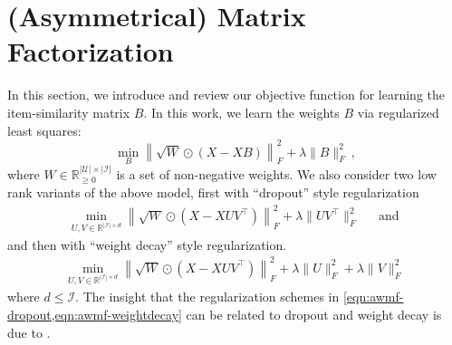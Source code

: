 \section{(Asymmetrical) Matrix Factorization}
In this section, we introduce and review our objective function for learning the item-similarity matrix $B$. In this work, we learn the weights $B$ via regularized least squares:
\begin{equation}\label{eqn:ease}
    \min_{B} \left\lVert \sqrt{W} \odot (X - XB)\right\rVert_F^2 + \lambda \|B\|_F^2\,,
\end{equation}
where $W \in \mathbb{R}_{\geq 0}^{|\mathcal{U}|\times |\mathcal{I}|}$ is a set of non-negative weights. We also consider two low rank variants of the above model, first with ``dropout'' style regularization
\begin{align}\label{eqn:awmf-dropout}
    \min_{U,V\in\mathbb{R}^{|\mathcal{I}|\times d}} \left\lVert \sqrt{W} \odot (X - XUV^\top)\right\rVert_F^2 + \lambda\|UV^\top\|_F^2\, \quad\text{ and }
\end{align}
and then with ``weight decay'' style regularization.
\begin{align}\label{eqn:awmf-weightdecay}
    \min_{U,V\in\mathbb{R}^{|\mathcal{I}|\times d}} \left\lVert \sqrt{W} \odot (X - XUV^\top)\right\rVert_F^2 + \lambda\|U\|_F^2 + \lambda \|V\|_F^2\,
\end{align}
where $d \leq \mathcal{I}$. The insight that the regularization schemes in \cref{eqn:awmf-dropout,eqn:awmf-weightdecay} can be related to dropout and weight decay is due to \citet{steck2021regularization}. 

